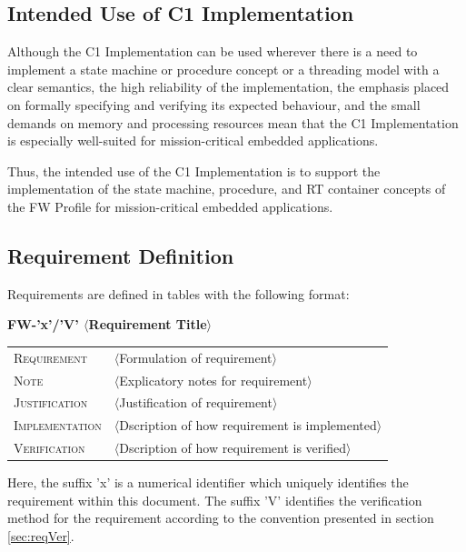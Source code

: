\documentclass[requirements]{../fwprofile}
\begin{document}
\subsection{Intended Use of C1 Implementation}\label{sec:intendedUse}
Although the C1 Implementation can be used wherever there is a need to implement a state machine or procedure concept or a threading model with a clear semantics, the high reliability of the implementation, the emphasis placed on formally specifying and verifying its expected behaviour, and the small demands on memory and processing resources mean that the C1 Implementation is especially well-suited for mission-critical embedded applications. 

Thus, the intended use of the C1 Implementation is to support the implementation of the state machine, procedure, and RT container concepts of the FW Profile for mission-critical embedded applications.

\subsection{Requirement Definition}\label{sec:reqDef}
Requirements are defined in tables with the following format:

\hspace{0.2cm}\textbf{FW-'x'/'V' \hspace{0.9cm} $\langle$Requirement Title$\rangle$}
\vspace{-10pt}

\begin{longtable}{p{2.7cm}P{8.5cm}}
\hline
\textsc{Requirement} & $\langle$Formulation of requirement$\rangle$ \\
\textsc{Note} & $\langle$Explicatory notes for requirement$\rangle$ \\
\textsc{Justification} & $\langle$Justification of requirement$\rangle$ \\
\textsc{Implementation} & $\langle$Dscription of how requirement is implemented$\rangle$ \\ 
\textsc{Verification} & $\langle$Dscription of how requirement is verified$\rangle$ \\
\hline
\end{longtable}

Here, the suffix 'x' is a numerical identifier which uniquely identifies the requirement
within this document. The suffix 'V' identifies the verification method for the requirement according to the convention presented in section \ref{sec:reqVer}.
\end{document}

